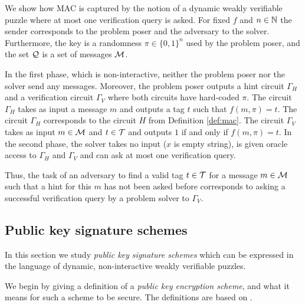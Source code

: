 We show how MAC is captured by the notion of a dynamic weakly verifiable puzzle where at most one verification query is asked.
For fixed $f$ and $n \in \mathbb{N}$ the sender corresponds to the problem poser and the adversary to the solver.
Furthermore, the key is a randomness $\pi \in \{0,1\}^{n}$ used by the problem poser, and the set $\mathcal{Q}$ is a set of messages $\mathcal{M}$.

In the first phase, which is non-interactive, neither the problem poser nor the solver send any messages.
Moreover, the problem poser outputs a hint circuit $\Gamma_H$ and a verification circuit $\Gamma_V$ where both circuits have hard-coded $\pi$.
The circuit $\Gamma_H$ takes as input a message $m$ and outputs a tag $t$ such that $f(m, \pi) = t$.
The circuit $\Gamma_H$ corresponds to the circuit $H$ from Definition \ref{def:mac}.
The circuit $\Gamma_V$ takes as input $m \in \mathcal{M}$ and $t \in \mathcal{T}$ and outputs $1$ if and only if $f(m, \pi) = t$.
In the second phase, the solver takes no input ($x$ is empty string), is given oracle access to $\Gamma_H$ and $\Gamma_V$ and
can ask at most one verification query.

Thus, the task of an adversary to find a valid tag $t \in \mathcal{T}$ for a message $m \in \mathcal{M}$ such that a hint for this $m$ has not been asked before
corresponds to asking a successful verification query by a problem solver to $\Gamma_V$.
%
\subsection{Public key signature schemes}
In this section we study \textit{public key signature schemes} which can be expressed in the language of dynamic,
non-interactive weakly verifiable puzzles.

We begin by giving a definition of a \textit{public key encryption scheme}, and what it means for such a scheme to be secure.
The definitions are based on \cite{Goldreich:2004:FCV:975541}.


